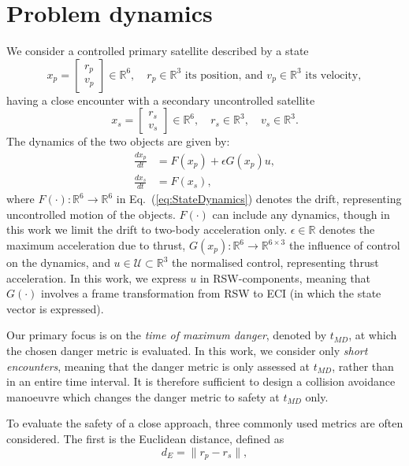\documentclass[letterpaper, preprint, paper,11pt]{AAS}	%
\renewcommand{\eqref}[1]{Eq.~(\ref{#1})}
\begin{document}
\section{Problem dynamics}

We consider a controlled primary satellite described by a state 
\[
x_p = \begin{bmatrix} r_p \\ v_p \end{bmatrix} \in \mathbb{R}^6, \quad r_p \in \mathbb{R}^3 \text{ its position, and } v_p \in \mathbb{R}^3 \text{ its velocity},
\]
having a close encounter with a secondary uncontrolled satellite
\[
x_s = \begin{bmatrix} r_s \\ v_s \end{bmatrix} \in \mathbb{R}^6, \quad r_s \in \mathbb{R}^3, \quad v_s \in \mathbb{R}^3.
\]
The dynamics of the two objects are given by:
\begin{align}\label{eq:StateDynamics}
	\frac{d x_p}{dt} &= F(x_p) + \epsilon G(x_p) u, \\
	\frac{d x_s}{dt} &= F(x_s),
\end{align}
where \( F(\cdot): \mathbb{R}^6 \rightarrow \mathbb{R}^6 \) in \eqref{eq:StateDynamics} denotes the drift, representing uncontrolled motion of the objects. \( F(\cdot) \) can include any dynamics, though in this work we limit the drift to two-body acceleration only. \( \epsilon \in \mathbb{R} \) denotes the maximum acceleration due to thrust, \( G(x_p): \mathbb{R}^6 \rightarrow \mathbb{R}^{6 \times 3} \) the influence of control on the dynamics, and \( u \in \mathcal{U} \subset \mathbb{R}^3 \) the normalised control, representing thrust acceleration. In this work, we express $u$ in RSW-components, meaning that $G(\cdot)$ involves a frame transformation from RSW to ECI (in which the state vector is expressed).


Our primary focus is on the \textit{time of maximum danger}, denoted by $t_{MD}$, at which the chosen danger metric is evaluated. In this work, we consider only \textit{short encounters}, meaning that the danger metric is only assessed at $t_{MD}$, rather than in an entire time interval. It is therefore sufficient to design a collision avoidance manoeuvre which changes the danger metric to safety at $t_{MD}$ only. 

To evaluate the safety of a close approach, three commonly used metrics are often considered. The first is the Euclidean distance, defined as 
\begin{equation}\label{eq:EucDis}
d_E = \| r_p - r_s \|,
\end{equation}
\end{document}
